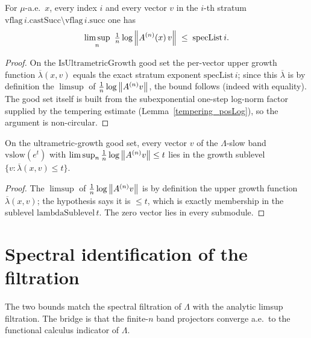 \begin{theorem}\label{spectral_upper_bound_of_squeeze}
  \leanok
  For \(\mu\)-a.e.\ \(x\), every index \(i\) and every vector \(v\) in the \(i\)-th stratum
  \(\mathrm{vflag}\,i.\mathrm{castSucc}\setminus\mathrm{vflag}\,i.\mathrm{succ}\) one has
  \[
    \limsup_{n}\ \tfrac1n\log\norm{A^{(n)}(x)\,v} \;\le\; \mathrm{specList}\,i.
  \]
\end{theorem}
\begin{proof}\leanok
  On the \(\mathrm{IsUltrametricGrowth}\) good set the per-vector upper growth function
  \(\overline\lambda(x,v)\) equals the exact stratum exponent \(\mathrm{specList}\,i\); since this
  \(\overline\lambda\) is by definition the \(\limsup\) of \(\tfrac1n\log\left\lVert A^{(n)}v \right\rVert\), the
  bound follows (indeed with equality). The good set itself is built from the subexponential
  one-step log-norm factor supplied by the tempering estimate (Lemma~\ref{tempering_posLog}), so
  the argument is non-circular.
\end{proof}

\begin{theorem}\label{vslow_subset_lambdaSublevel_of_upper}
  \leanok
  On the ultrametric-growth good set, every vector \(v\) of the \(\Lambda\)-slow band
  \(\mathrm{vslow}(e^t)\) with \(\limsup_n\tfrac1n\log\left\lVert A^{(n)}v \right\rVert\le t\) lies in the growth
  sublevel \(\{v:\overline\lambda(x,v)\le t\}\).
\end{theorem}
\begin{proof}\leanok
  The \(\limsup\) of \(\tfrac1n\log\left\lVert A^{(n)}v \right\rVert\) is by definition the upper growth function
  \(\overline\lambda(x,v)\); the hypothesis says it is \(\le t\), which is exactly membership in
  the sublevel \(\mathrm{lambdaSublevel}\,t\). The zero vector lies in every submodule.
\end{proof}

\section{Spectral identification of the filtration}

The two bounds match the spectral filtration of \(\Lambda\) with the analytic limsup filtration.
The bridge is that the finite-\(n\) band projectors converge a.e.\ to the functional calculus
indicator of \(\Lambda\).

